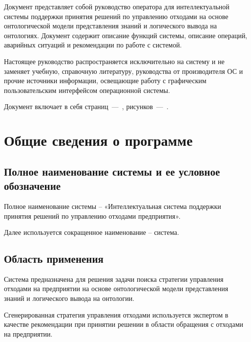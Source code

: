 \documentclass[a4paper]{G2-105}
\begin{document}
%
\VSTUInitializeRDOperator
%


Документ представляет собой руководство оператора для интеллектуальной системы поддержки принятия решений по управлению отходами на основе онтологической модели представления знаний и логического вывода на онтологиях. Документ содержит описание функций системы, описание операций, аварийных ситуаций и рекомендации по работе с системой. 

Настоящее руководство распространяется исключительно на систему и не заменяет учебную, справочную литературу, руководства от производителя ОС и прочие источники информации, освещающие работу с графическим
пользовательским интерфейсом операционной системы.

Документ включает в себя страниц~---~\totalpages, рисунков~---~\totalfigures.

\CommonKeywords

\newpage

\tableofcontents

\newpage

\chapter{Общие сведения о программе}

\ttl

\section{Полное наименование системы и ее условное обозначение}

Полное наименование системы -- «Интеллектуальная система поддержки принятия решений по управлению отходами предприятия».

Далее используется сокращенное наименование -- система.

\section{Область применения}

Система предназначена для решения задачи поиска стратегии управления отходами на предприятии на основе онтологической модели представления знаний и логического вывода на онтологии.

Сгенерированная стратегия управления отходами используется экспертом в качестве рекомендации при принятии решении в области обращения с отходами на предприятии.
\end{document}
